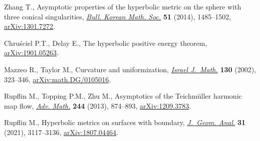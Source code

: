 Zhang T., Asymptotic properties of the hyperbolic metric on the sphere with
 three conical singularities, \href{https://doi.org/10.4134/BKMS.2014.51.5.1485}{\textit{Bull. Korean Math. Soc.}} \textbf{51}
 (2014), 1485--1502, \href{https://arxiv.org/abs/1301.7272}{arXiv:1301.7272}.


Chru\'sciel P.T., Delay E., The hyperbolic positive energy theorem,
 \href{https://arxiv.org/abs/}{arXiv:1901.05263}.


Mazzeo R., Taylor M., Curvature and uniformization, \href{https://doi.org/10.1007/BF02764082}{\textit{Israel J.~Math.}}
 \textbf{130} (2002), 323--346, \href{https://arxiv.org/abs/math.DG/0105016}{arXiv:math.DG/0105016}.


Rupflin M., Topping P.M., Zhu M., Asymptotics of the {T}eichm\"uller harmonic
 map flow, \href{https://doi.org/10.1016/j.aim.2013.05.021}{\textit{Adv. Math.}} \textbf{244} (2013), 874--893,
 \href{https://arxiv.org/abs/1209.3783}{arXiv:1209.3783}.


Rupflin M., Hyperbolic metrics on surfaces with boundary, \href{https://doi.org/10.1007/s12220-020-00386-2}{\textit{J.~Geom.
 Anal.}} \textbf{31} (2021), 3117--3136, \href{https://arxiv.org/abs/1807.04464}{arXiv:1807.04464}.

